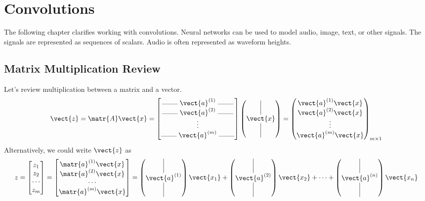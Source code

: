 \chapter{Convolutions}
The following chapter clarifies working with convolutions.
Neural networks can be used to model audio, image, text, or other signals. The signals are represented as sequences of scalars. Audio is often represented as waveform heights. 
\section{Matrix Multiplication Review}
Let's review multiplication between a matrix and a vector.
\[
\vect{z} = {\matr{A}}\vect{x} =
\begin{bmatrix}
    \rule[0.5mm]{0.8cm}{0.1mm} \; {\vect{a}}^{(1)} \; \rule[0.5mm]{0.8cm}{0.1mm} \\
    \rule[0.5mm]{0.8cm}{0.1mm} \; {\vect{a}}^{(2)} \; \rule[0.5mm]{0.8cm}{0.1mm} \\
    \vdots \\
    \rule[0.5mm]{0.8cm}{0.1mm} \; {\vect{a}}^{(m)} \; \rule[0.5mm]{0.8cm}{0.1mm} \\
\end{bmatrix}
\begin{pmatrix}
    \vrule height 0.6cm \\ \vect{x} \\ \vrule height 0.6cm
\end{pmatrix} =
\begin{pmatrix}
    {\vect{a}}^{(1)} \vect{x} \\ {\vect{a}}^{(2)} \vect{x} \\ \vdots \\ {\vect{a}}^{(m)} \vect{x}
\end{pmatrix}_{m \times 1}
\]
Alternatively, we could write $\vect{z}$ as 
\[z = \begin{bmatrix} z_1 \\ z_2 \\ \cdots \\z_m\end{bmatrix} = \begin{bmatrix} \matr{a}^{(1)}\vect{x} \\ \matr{a}^{(2)}\vect{x} \\\cdots \\\matr{a}^{(m)}\vect{x}\end{bmatrix}
= \begin{pmatrix}
    \vrule height 0.6cm \\ \vect{a}^{(1)} \\ \vrule height 0.6cm
\end{pmatrix} \vect{x_1} + \begin{pmatrix}
    \vrule height 0.6cm \\ \vect{a}^{(2)} \\ \vrule height 0.6cm
\end{pmatrix} \vect{x_2}+\cdots+\begin{pmatrix}
    \vrule height 0.6cm \\ \vect{a}^{(n)} \\ \vrule height 0.6cm
\end{pmatrix} \vect{x_n}\]

